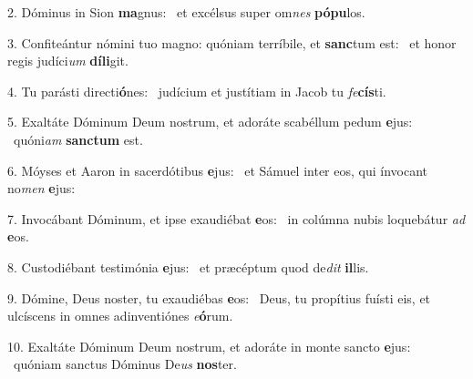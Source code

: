 2. Dóminus in Sion \textbf{ma}gnus: \ast\  et excélsus super om\textit{nes} \textbf{pó}\textbf{pu}los.\

3. Confiteántur nómini tuo magno: quóniam terríbile, et \textbf{sanc}tum est: \ast\  et honor regis judíci\textit{um} \textbf{dí}\textbf{li}git.\

4. Tu parásti directi\textbf{ó}nes: \ast\  judícium et justítiam in Jacob tu \textit{fe}\textbf{cís}ti.\

5. Exaltáte Dóminum Deum nostrum, et adoráte scabéllum pedum \textbf{e}jus: \ast\  quóni\textit{am} \textbf{sanc}\textbf{tum} est.\

6. Móyses et Aaron in sacerdótibus \textbf{e}jus: \ast\  et Sámuel inter eos, qui ínvocant no\textit{men} \textbf{e}jus:\

7. Invocábant Dóminum, et ipse exaudiébat \textbf{e}os: \ast\  in colúmna nubis loquebátur \textit{ad} \textbf{e}os.\

8. Custodiébant testimónia \textbf{e}jus: \ast\  et præcéptum quod de\textit{dit} \textbf{il}lis.\

9. Dómine, Deus noster, tu exaudiébas \textbf{e}os: \ast\  Deus, tu propítius fuísti eis, et ulcíscens in omnes adinventiónes \textit{e}\textbf{ó}rum.\

10. Exaltáte Dóminum Deum nostrum, et adoráte in monte sancto \textbf{e}jus: \ast\  quóniam sanctus Dóminus De\textit{us} \textbf{nos}ter.\

